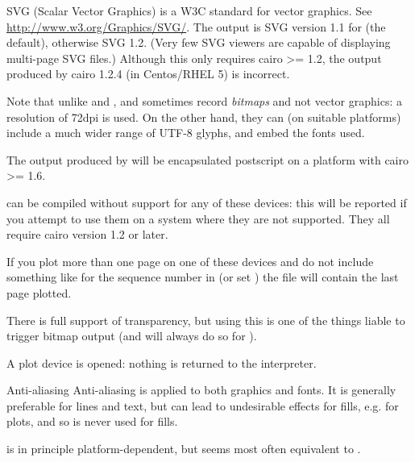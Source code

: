 %
\begin{Details}\relax
SVG (Scalar Vector Graphics) is a W3C standard for vector graphics.
See \url{http://www.w3.org/Graphics/SVG/}.  The output is SVG version
1.1 for  (the default), otherwise SVG 1.2.  (Very few
SVG viewers are capable of displaying multi-page SVG files.)  Although
this only requires cairo >= 1.2, the output produced by cairo 1.2.4
(in Centos/RHEL 5) is incorrect.

Note that unlike  and ,
 and  sometimes record \emph{bitmaps}
and not vector graphics: a resolution of 72dpi is used.  On the other
hand, they can (on suitable platforms) include a much wider range of
UTF-8 glyphs, and embed the fonts used.

The output produced by  will be
encapsulated postscript on a platform with cairo >= 1.6.

\R{} can be compiled without support for any of these
devices: this will be reported if you attempt to use them on a system
where they are not supported.  They all require cairo version 1.2 or
later.

If you plot more than one page on one of these devices and do not
include something like  for the sequence number in
 (or set ) the file will contain the
last page plotted.

There is full support of transparency, but using this is one of the
things liable to trigger bitmap output (and will always do so for
).
\end{Details}
%
\begin{Value}
A plot device is opened: nothing is returned to the \R{} interpreter.
\end{Value}
%
\begin{Section}{Anti-aliasing}
Anti-aliasing is applied to both graphics and fonts.  It is generally
preferable for lines and text, but can lead to undesirable effects for
fills, e.g. for  plots, and so is never used for
fills.

 is in principle platform-dependent, but
seems most often equivalent to .
\end{Section}
%
